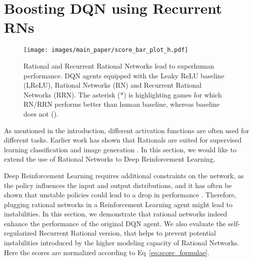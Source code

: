 \documentclass{article}
\begin{document}
\section{Boosting DQN using Recurrent RNs}
\begin{figure}[t]
    \centering
    \texttt{[image: images/main\_paper/score\_bar\_plot\_h.pdf]}
    \caption{Rational and Recurrent Rational Networks lead to superhuman performance. DQN agents equipped with the Leaky ReLU baseline (LReLU), Rational Networks (RN) and Recurrent Rational Networks (RRN). The asterisk (*) is highlighting games for which RN/RRN performs better than human baseline, whereas baseline does not (). \label{fig:scores_bar_plot}}
\end{figure}
\label{sec:reinforcementlearning}
As mentioned in the introduction, different activation functions are often used for different tasks. Earlier work has shown that Rationals are suited for supervised learning classification \cite{molina2019pad} and image generation \cite{BoulleNT20}. In this section, we would like to extend the use of Rational Networks to Deep Reinforcement Learning.

Deep Reinforcement Learning requires additional constraints on the network, as the policy influences the input and output distributions, and it has often be shown that unstable policies could lead to a drop in performance \cite{SchulmanLAJM15, SchulmanWDRK17}. Therefore, plugging rational networks in a Reinforcement Learning agent might lead to instabilities. In this section, we demonstrate that rational networks indeed enhance the performance of the original DQN agent. We also evaluate the self-regularized Recurrent Rational version, that helps to prevent potential instabilities introduced by the higher modeling capacity of Rational Networks. Here the scores are normalized according to Eq~\ref{eq:score_formulae}.
\end{document}
